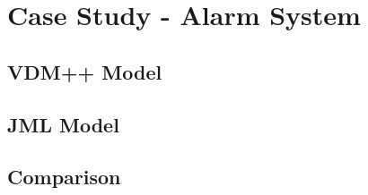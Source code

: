 \chapter{Case Study - Alarm System}
\label{sec:chapter3}

\section{VDM++ Model}
\label{sec:chapter3:vdmmodel}

\section{JML Model}
\label{sec:chapter3:jmlmodel}

\section{Comparison}
\label{sec:chapter3:compare}


